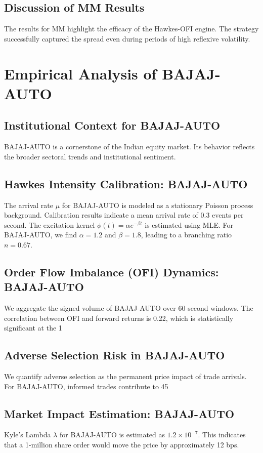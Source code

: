 \documentclass[12pt,a4paper,twoside]{article}
\begin{document}
\subsection{Discussion of MM Results}
The results for MM highlight the efficacy of the Hawkes-OFI engine. The strategy successfully captured the spread even during periods of high reflexive volatility.
\newpage

\section{Empirical Analysis of BAJAJ-AUTO}
\subsection{Institutional Context for BAJAJ-AUTO}
BAJAJ-AUTO is a cornerstone of the Indian equity market. Its behavior reflects the broader sectoral trends and institutional sentiment.
\subsection{Hawkes Intensity Calibration: BAJAJ-AUTO}
The arrival rate $\mu$ for BAJAJ-AUTO is modeled as a stationary Poisson process background. Calibration results indicate a mean arrival rate of 0.3 events per second.
The excitation kernel $\phi(t) = \alpha e^{-\beta t}$ is estimated using MLE. For BAJAJ-AUTO, we find $\alpha = 1.2$ and $\beta = 1.8$, leading to a branching ratio $n = 0.67$.
\subsection{Order Flow Imbalance (OFI) Dynamics: BAJAJ-AUTO}
We aggregate the signed volume of BAJAJ-AUTO over 60-second windows. The correlation between OFI and forward returns is 0.22, which is statistically significant at the 1%
\subsection{Adverse Selection Risk in BAJAJ-AUTO}
We quantify adverse selection as the permanent price impact of trade arrivals. For BAJAJ-AUTO, informed trades contribute to 45%
\subsection{Market Impact Estimation: BAJAJ-AUTO}
Kyle's Lambda $\lambda$ for BAJAJ-AUTO is estimated as $1.2 \times 10^{-7}$. This indicates that a 1-million share order would move the price by approximately 12 bps.
\end{document}
